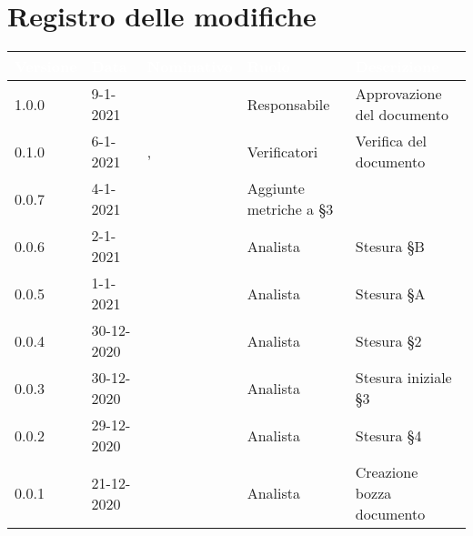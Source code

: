 \section*{Registro delle modifiche}
\setcounter{table}{-1}
{
\renewcommand{\arraystretch}{1.5}
\centering
\begin{longtable}{C{1.7cm} C{2.5cm} C{3.2cm} C{2.7cm} C{4.8cm}}
\textcolor{white}{\textbf{Versione}}&
\textcolor{white}{\textbf{Data}}&
\textcolor{white}{\textbf{Nominativo}}&
\textcolor{white}{\textbf{Ruolo}}&
\textcolor{white}{\textbf{Descrizione}}\\	
\endhead

1.0.0 & 9-1-2021 & \BM{} & Responsabile & Approvazione del documento \\
0.1.0 & 6-1-2021 & \SP{}, \BM{} & Verificatori & Verifica del documento \\
0.0.7 & 4-1-2021 & \ZM{} & Aggiunte metriche a \S 3\\
0.0.6 & 2-1-2021 & \RA{} & Analista & Stesura \S B \\
0.0.5 & 1-1-2021 & \PA{} & Analista & Stesura \S A \\
0.0.4 & 30-12-2020 & \PA{} & Analista & Stesura \S 2 \\
0.0.3 & 30-12-2020 & \ZM{} & Analista & Stesura iniziale \S 3\\
0.0.2 & 29-12-2020 & \RA{} & Analista & Stesura \S 4 \\
0.0.1 & 21-12-2020 & \ZM{} & Analista & Creazione bozza documento \\	
\end{longtable}
}
